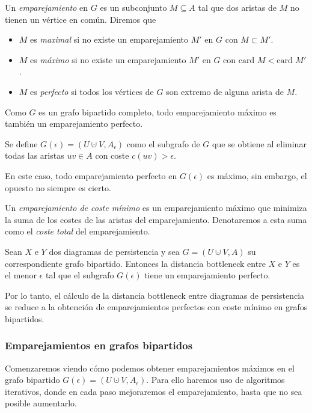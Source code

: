 \begin{definition}
Un \emph{emparejamiento} en $G$ es un subconjunto $M \subseteq A$ tal que dos aristas de $M$ no tienen un vértice en común. Diremos que
\begin{itemize}
	\item $M$ es \emph{maximal} si no existe un emparejamiento $M'$ en $G$ con $M \subset M'$.
	\item $M$ es \emph{máximo} si no existe un emparejamiento $M'$ en $G$ con $\text{card } M < \text{card } M'$.
	\item $M$ es \emph{perfecto} si todos los vértices de $G$ son extremo de alguna arista de $M$.
\end{itemize}
\end{definition}

Como $G$ es un grafo bipartido completo, todo emparejamiento máximo es también un emparejamiento perfecto.

\begin{definition}
Se define $G(\epsilon)=(U \cupdot V, A_\epsilon)$ como el subgrafo de $G$ que se obtiene al eliminar todas las aristas $uv \in A$ con coste $c(uv)>\epsilon$.  
\end{definition}
En este caso, todo emparejamiento perfecto en $G(\epsilon)$ es máximo, sin embargo, el opuesto no siempre es cierto.

\begin{definition}
Un \emph{emparejamiento de coste mínimo} es un emparejamiento máximo que minimiza la suma de los costes de las aristas del emparejamiento. Denotaremos a esta suma como el \emph{coste total} del emparejamiento.
\end{definition}

\begin{lemma}
Sean $X$ e $Y$ dos diagramas de persistencia y sea $G =(U \cupdot V, A)$ su correspondiente grafo bipartido. Entonces la distancia bottleneck entre $X$ e $Y$ es el menor $\epsilon$ tal que el subgrafo $G(\epsilon)$ tiene un emparejamiento perfecto.
\end{lemma}

Por lo tanto, el cálculo de la distancia bottleneck entre diagramas de persistencia se reduce a la obtención de emparejamientos perfectos con coste mínimo en grafos bipartidos.

\subsubsection*{Emparejamientos en grafos bipartidos}
Comenzaremos viendo cómo podemos obtener emparejamientos máximos en el grafo bipartido $G(\epsilon)=(U \cupdot V, A_\epsilon)$. Para ello haremos uso de algoritmos iterativos, donde en cada paso mejoraremos el emparejamiento, hasta que no sea posible aumentarlo.

